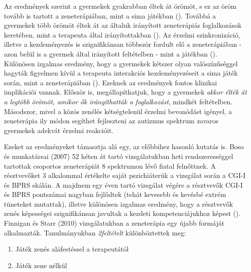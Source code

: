 Az eredmények szerint a gyermekek gyakrabban éltek át örömöt, s ez az öröm tovább is tartott a zeneterápiában, mint a sima játékban (\cite{kim_wigram_gold_2009}). Továbbá a gyermekek több örömöt éltek át az általuk irányított zeneterápiás foglalkozások keretében, mint a terapeuta által irányítottakban (\cite{kim_wigram_gold_2009}). Az érzelmi szinkronizáció, illetve a kezdeményezés is szignifikánsan többször fordult elő a zeneterápiában - azon belül is a gyermek által irányított feltételben - mint a játékban (\cite{kim_wigram_gold_2009}). Különösen izgalmas eredmény, hogy a gyermekek kétszer olyan valószínűséggel hagyták figyelmen kívül a terapeuta interakciós kezdeményezéseit a sima játék során, mint a zeneterápiában (\cite{kim_wigram_gold_2009}). Ezeknek az eredmények fontos klinikai implikációi vannak. Először is, megállapíthatjuk, hogy a gyermekek \textit{akkor élték át a legtöbb örömöt, amikor ők irányíthatták a foglalkozást}, mindkét feltételben. Másodszor, mivel a közös zenélés kétségtelenül érzelmi bevonódást igényel, a zeneterápia ily módon segíthet fejleszteni az autizmus spektrum zavaros gyermekek adekvát érzelmi reakcióit.

Ezeket az eredményeket támasztja alá egy, az előbbihez hasonló kutatás is. Boso és munkatársai (2007) 52 héten át tartó vizsgálatukban heti rendszerességgel tartottak csoportos zeneterápiát 8 spektrumon lévő fiatal felnőttnek. A résztvevőket 3 alkalommal értékelte saját pszichiáterük a vizsgálat során a CGI-I és BPRS skálán. A majdnem egy éven tartó vizsgálat végére a résztvevők CGI-I és BPRS pontszámai nagyban fejlődtek (tehát kevesebb és kevésbé extrém tüneteket mutattak), illetve különösen izgalmas eredmény, hogy a résztvevők zenés képességei szignifikánsan javultak a kezdeti kompetenciájukhoz képest (\cite{boso_emanuele_minazzi_abbamonte_politi_2007}). Finnigan és Starr (2010) vizsgálatukban a zeneterápia egy újabb formáját alkalmazták. Tanulmányukban \textit{2feltételt} különböztettek meg:

\begin{enumerate}
	\item Játék zenés aláfestéssel a terapeutától
	\item Játék zene nélkül
\end{enumerate}  

